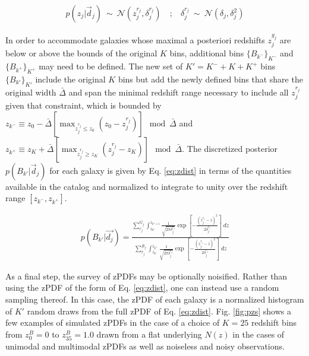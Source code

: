 \documentclass[preprint]{aastex}
\begin{document}
\begin{eqnarray}
\label{eq:zspread}
p(z_{j}|\vec{d}_{j})\ \sim\ \mathcal{N}(z^{r_{j}}_{j},\delta^{r_{j}}_{j})\ &;&\ \delta^{r_{j}}_{j}\ \sim\ \mathcal{N}(\delta_{j},\delta_{j}^{2})
\end{eqnarray}

In order to accommodate galaxies whose maximal a posteriori redshifts $z^{g_{j}}_{j}$ are below or above the bounds of the original $K$ bins, additional bins $\{B_{k^{-}}\}_{K^{-}}$ and $\{B_{k^{+}}\}_{K^{+}}$ may need to be defined.  The new set of $K'=K^{-}+K+K^{+}$ bins $\{B_{k'}\}_{K'}$ include the original $K$ bins but add the newly defined bins that share the original width $\bar{\Delta}$ and span the minimal redshift range necessary to include all $z^{r_{j}}_{j}$ given that constraint, which is bounded by $z_{k^{-}}\equiv z_{0}-\bar{\Delta}[\max_{z^{r_{j}}_{j}\leq z_{0}}(z_{0}-z^{r_{j}}_{j})]\mod\bar{\Delta}$ and $z_{k^{+}}\equiv z_{K}+\bar{\Delta}[\max_{z^{r_{j}}_{j}\geq z_{K}}(z^{r_{j}}_{j}-z_{K})]\mod\bar{\Delta}$.  The discretized posterior $p(B_{k'}|\vec{d}_{j})$ for each galaxy is given by Eq. \ref{eq:zdist} in terms of the quantities available in the catalog and normalized to integrate to unity over the redshift range $[z_{k^{-}},z_{k^{+}}]$.  

\begin{eqnarray}
\label{eq:zdist}
p(B_{k'}|\vec{d_{j}}) = \frac{\sum_{r_{j}}^{G_{j}}\int_{z_{k'}}^{z_{k'+1}} \frac{1}{\sqrt{2\pi\delta^{r_{j}}_{j}}}\exp\left[-\frac{(z^{r_{j}}_{j}-z)^{2}}{2\delta^{r_{j}}_{j}}\right]\ dz}{\sum_{r_{j}}^{R_{j}}\int_{z_{k^{-}}}^{z_{k^{+}}} \frac{1}{\sqrt{2\pi\delta^{r_{j}}_{j}}}\exp\left[-\frac{(z^{r_{j}}_{j}-z)^{2}}{2\delta^{r_{j}}_{j}}\right]\ dz}
\end{eqnarray}

As a final step, the survey of zPDFs may be optionally noisified.  Rather than using the zPDF of the form of Eq. \ref{eq:zdist}, one can instead use a random sampling thereof.  In this case, the zPDF of each galaxy is a normalized histogram of $K'$ random draws from the full zPDF of Eq. \ref{eq:zdist}.  Fig. \ref{fig:pzs} shows a few examples of simulated zPDFs in the case of a choice of $K=25$ redshift bins from $z^{B}_{0}=0$ to $z^{B}_{35}=1.0$ drawn from a flat underlying $N(z)$ in the cases of unimodal and multimodal zPDFs as well as noiseless and noisy observations.
\end{document}
